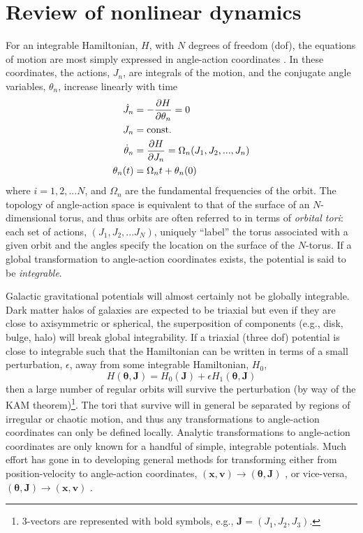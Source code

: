 \documentclass[letterpaper,12pt,preprint]{aastex}
\newcommand{\bs}[1]{\boldsymbol{#1}}
\newcommand{\act}{J}
\begin{document}
\section{Review of nonlinear dynamics}\label{sec:nldreview}

For an integrable Hamiltonian, $H$, with $N$ degrees of freedom (dof), the equations of motion are most simply expressed in angle-action coordinates \cite[e.g.,][]{goldstein80}. In these coordinates, the actions, $J_n$, are integrals of the motion, and the conjugate angle variables, $\theta_n$, increase linearly with time
\begin{align}
	\dot{\act}_n &= -\frac{\partial H}{\partial \theta_n} = 0\\
	\act_n &= {\rm const.}\\
	\dot{\theta}_n &= \frac{\partial H}{\partial \act_n} = \Omega_n(\act_1,\act_2,...,\act_n)\label{eq:aafreq}\\
	\theta_n(t) &= \Omega_n t + \theta_n(0)
\end{align}
where $i=1,2,...N$, and $\Omega_n$ are the fundamental frequencies of the orbit. The topology of angle-action space is equivalent to that of the surface of an $N$-dimensional torus, and thus orbits are often referred to in terms of \emph{orbital tori}: each set of actions, $(\act_1,\act_2,...\act_N)$, uniquely ``label'' the torus associated with a given orbit and the angles specify the location on the surface of the $N$-torus. If a global transformation to angle-action coordinates exists, the potential is said to be \emph{integrable}.

Galactic gravitational potentials will almost certainly not be globally integrable. Dark matter halos of galaxies are expected to be triaxial but even if they are close to axisymmetric or spherical, the superposition of components (e.g., disk, bulge, halo) will break global integrability. If a triaxial (three dof) potential is close to integrable such that the Hamiltonian can be written in terms of a small perturbation, $\epsilon$, away from some integrable Hamiltonian, $H_0$,
\begin{equation}
	H(\bs{\theta}, \bs{\act}) = H_0(\bs{\act}) + \epsilon H_1(\bs{\theta}, \bs{\act})
\end{equation}
then a large number of regular orbits will survive the perturbation (by way of the KAM theorem)\footnote{3-vectors are represented with bold symbols, e.g., $\bs{J}=(J_1,J_2,J_3)$.}. The tori that survive will in general be separated by regions of irregular or chaotic motion, and thus any transformations to angle-action coordinates can only be defined locally. Analytic transformations to angle-action coordinates are only known for a handful of simple, integrable potentials. Much effort has gone in to developing general methods for transforming either from position-velocity to angle-action coordinates, $(\bs{x},\bs{v})\rightarrow(\bs{\theta},\bs{J})$ \citep{many}, or vice-versa, $(\bs{\theta},\bs{J})\rightarrow(\bs{x},\bs{v})$ \citep{many}.
\end{document}

